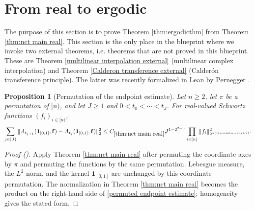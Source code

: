 \documentclass[12pt,reqno]{amsart}
\newcommand{\auto}{{({\tiny\faCar})}}
\theoremstyle{plain}
\newtheorem{proposition}[theorem]{Proposition}
\numberwithin{equation}{section}
\theoremstyle{remark}
\newcommand{\uses}[1]{}
\newcommand{\usesdefs}[1]{}
\newcommand{\leanok}{}
\newcommand{\lean}[1]{}
\begin{document}
\section{From real to ergodic}\label{sec:realtoergodic}
The purpose of this section is to prove Theorem \ref{thm:ergodicthm} from Theorem \ref{thm:nct main real}.
This section is the only place in the blueprint where we invoke two external theorems, i.e. theorems that are not proved in this blueprint. These are Theorem \ref{multilinear interpolation external} (multilinear complex interpolation) and Theorem \ref{Calderon transference external} (Calder\'on transference principle).
The latter was recently formalized in Lean by Pernegger \cite{Pernegger2025}.

\begin{proposition}[Permutation of the endpoint estimate]\label{permutation of endpoint estimate}\lean{Auto.permutation_of_endpoint_estimate}\leanok\uses{thm:nct main real}\usesdefs{A_def}
Let $n\ge 2$, let $\pi$ be a permutation of $[n)$, and let $J\ge 1$ and $0<t_0<\cdots<t_J$. For real-valued Schwartz functions $(f_i)_{i\in[n)}$,
\begin{equation}\label{permuted endpoint estimate}
\sum_{j\in[J)}\|A_{t_{j+1}}(\mathbf 1_{[0,1]},\mathbf f)-A_{t_j}(\mathbf 1_{[0,1]},\mathbf f)\|_2^2
\le C_{\ref{thm:nct main real}}J^{1-2^{2-n}}
\prod_{i\in[n)}\|f_i\|_{2^{\pi(i)+\min(n-\pi(i),2)}}^2.
\end{equation}
\end{proposition}

\begin{proof}[Proof \auto]
Apply Theorem \ref{thm:nct main real} after permuting the coordinate axes by $\pi$ and permuting the functions by the same permutation. Lebesgue measure, the $L^2$ norm, and the kernel $\mathbf 1_{[0,1]}$ are unchanged by this coordinate permutation. The normalization in Theorem \ref{thm:nct main real} becomes the product on the right-hand side of \eqref{permuted endpoint estimate}; homogeneity gives the stated form.
\end{proof}
\end{document}
